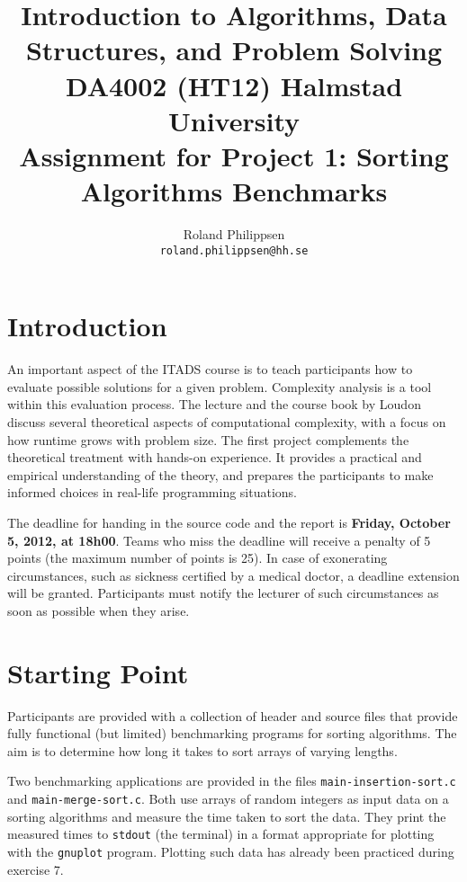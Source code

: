 \documentclass[a4paper,10pt]{article}
\begin{document}
\title{
  {\normalsize
    Introduction to Algorithms, Data Structures, and Problem Solving\\
    DA4002 (HT12) Halmstad University}\\
  Assignment for Project 1: Sorting Algorithms Benchmarks\\
}
\author{
  Roland Philippsen\\
  \texttt{roland.philippsen@hh.se}
}
\maketitle



\section{Introduction}

An important aspect of the ITADS course is to teach participants how to evaluate possible solutions for a given problem.
Complexity analysis is a tool within this evaluation process.
The lecture and the course book by Loudon~\cite{loudon} discuss several theoretical aspects of computational complexity, with a focus on how runtime grows with problem size.
The first project complements the theoretical treatment with hands-on experience.
It provides a practical and empirical understanding of the theory, and prepares the participants to make informed choices in real-life programming situations.

The deadline for handing in the source code and the report is \textbf{Friday, October 5, 2012, at 18h00}.
Teams who miss the deadline will receive a penalty of 5 points (the maximum number of points is 25).
In case of exonerating circumstances, such as sickness certified by a medical doctor, a deadline extension will be granted.
Participants must notify the lecturer of such circumstances as soon as possible when they arise.



\section{Starting Point}

Participants are provided with a collection of header and source files that provide fully functional (but limited) benchmarking programs for sorting algorithms.
The aim is to determine how long it takes to sort arrays of varying lengths.

Two benchmarking applications are provided in the files \texttt{main-insertion-sort.c} and \texttt{main\--merge\--sort.c}.
Both use arrays of random integers as input data on a sorting algorithms and measure the time taken to sort the data.
They print the measured times to \texttt{stdout} (the terminal) in a format appropriate for plotting with the \texttt{gnuplot} program.
Plotting such data has already been practiced during exercise 7.
\end{document}

